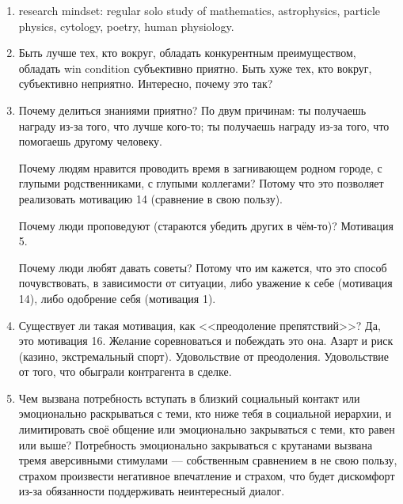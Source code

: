 \documentclass[11pt]{article}
\theoremstyle{remark}
\theoremstyle{definition}
\begin{document}
\begin{enumerate}
\item research mindset: regular solo study of mathematics, astrophysics, particle physics, cytology, poetry, human physiology.




\item Быть лучше тех, кто вокруг, обладать конкурентным преимуществом, обладать win condition субъективно приятно. Быть хуже тех, кто вокруг, субъективно неприятно. Интересно, почему это так?

\item Почему делиться знаниями приятно? По двум причинам: ты получаешь награду из-за того, что лучше кого-то; ты получаешь награду из-за того, что помогаешь другому человеку.

Почему людям нравится проводить время в загнивающем родном городе, с глупыми родственниками, с глупыми коллегами? Потому что это позволяет реализовать мотивацию 14 (сравнение в свою пользу).


Почему люди проповедуют (стараются убедить других в чём-то)? Мотивация 5.


Почему люди любят давать советы? Потому что им кажется, что это способ почувствовать, в зависимости от ситуации, либо уважение к себе (мотивация 14), либо одобрение себя (мотивация 1).

\item Существует ли такая мотивация, как <<преодоление препятствий>>? Да, это мотивация 16. Желание соревноваться и побеждать это она. Азарт и риск (казино, экстремальный спорт). Удовольствие от преодоления. Удовольствие от того, что обыграли контрагента в сделке.

\item Чем вызвана потребность вступать в близкий социальный контакт или эмоционально раскрываться с теми, кто ниже тебя в социальной иерархии, и лимитировать своё общение или эмоционально закрываться с теми, кто равен или выше? Потребность эмоционально закрываться с крутанами вызвана тремя аверсивными стимулами --- собственным сравнением в не свою пользу, страхом произвести негативное впечатление и страхом, что будет дискомфорт из-за обязанности поддерживать неинтересный диалог. 


\end{enumerate}
\end{document}
